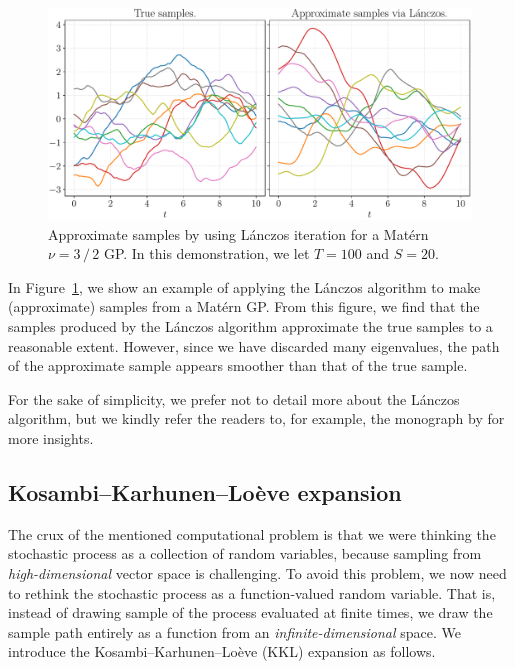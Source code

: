 \documentclass[]{article}
\begin{document}
\begin{figure}[t!]
	\centering
	\includegraphics[width=.9\linewidth]{figs/lanczos-demo}
	\caption{Approximate samples by using L\'{a}nczos iteration for a Mat\'{e}rn $\nu=3 \, / \, 2$ GP. In this demonstration, we let $T = 100$ and $S=20$.}
	\label{fig:lanczos-gp}
\end{figure}

In Figure~\ref{fig:lanczos-gp}, we show an example of applying the L\'{a}nczos algorithm to make (approximate) samples from a Mat\'{e}rn GP. From this figure, we find that the samples produced by the L\'{a}nczos algorithm approximate the true samples to a reasonable extent. However, since we have discarded many eigenvalues, the path of the approximate sample appears smoother than that of the true sample.

For the sake of simplicity, we prefer not to detail more about the L\'{a}nczos algorithm, but we kindly refer the readers to, for example, the monograph by \citet{Golub2013} for more insights.

\subsection{Kosambi--Karhunen--Lo\`{e}ve expansion}
\label{sec:karhunen-loeve}
The crux of the mentioned computational problem is that we were thinking the stochastic process as a collection of random variables, because sampling from \emph{high-dimensional} vector space is challenging. To avoid this problem, we now need to rethink the stochastic process as a function-valued random variable. That is, instead of drawing sample of the process evaluated at finite times, we draw the sample path entirely as a function from an \emph{infinite-dimensional} space. We introduce the Kosambi--Karhunen--Lo\`{e}ve (KKL) expansion as follows.
\end{document}
